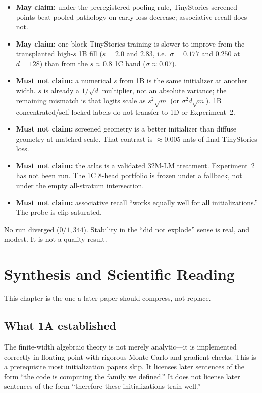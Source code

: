 \documentclass[11pt,a4paper]{report}
\begin{document}
\begin{itemize}[leftmargin=*]
  \item \textbf{May claim:} under the preregistered pooling rule, TinyStories screened points beat pooled pathology on early loss decrease; associative recall does not.
  \item \textbf{May claim:} one-block TinyStories training is slower to improve from the transplanted high-$s$ 1B fill ($s=2.0$ and $2.83$, i.e.\ $\sigma=0.177$ and $0.250$ at $d=128$) than from the $s\approx 0.8$ 1C band ($\sigma\approx 0.07$).
  \item \textbf{Must not claim:} a numerical $s$ from 1B is the same initializer at another width. $s$ is already a $1/\sqrt{d}$ multiplier, not an absolute variance; the remaining mismatch is that logits scale as $s^2\sqrt{m}$ (or $\sigma^2 d\sqrt{m}$). 1B concentrated/self-locked labels do not transfer to 1D or Experiment~2.
  \item \textbf{Must not claim:} screened geometry is a better initializer than diffuse geometry at matched scale. That contrast is $\approx 0.005$ nats of final TinyStories loss.
  \item \textbf{Must not claim:} the atlas is a validated 32M-LM treatment. Experiment~2 has not been run. The 1C 8-head portfolio is frozen under a fallback, not under the empty all-stratum intersection.
  \item \textbf{Must not claim:} associative recall ``works equally well for all initializations.'' The probe is clip-saturated.
\end{itemize}

No run diverged ($0/1{,}344$). Stability in the ``did not explode'' sense is real, and modest. It is not a quality result.

\chapter{Synthesis and Scientific Reading}

This chapter is the one a later paper should compress, not replace.

\section{What 1A established}

The finite-width algebraic theory is not merely analytic---it is implemented correctly in floating point with rigorous Monte Carlo and gradient checks. This is a prerequisite most initialization papers skip. It licenses later sentences of the form ``the code is computing the family we defined.'' It does not license later sentences of the form ``therefore these initializations train well.''
\end{document}
